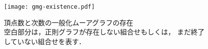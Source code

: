 \begin{figure}[htbp]
  \centering
  \captionsetup{justification=centering}
  \texttt{[image: gmg-existence.pdf]}
  \caption{頂点数と次数の一般化ムーアグラフの存在\\
    空白部分は，正則グラフが存在しない組合せもしくは，
    まだ終了していない組合せを表す．}
  \label{fig:gmg-existence}
\end{figure}
